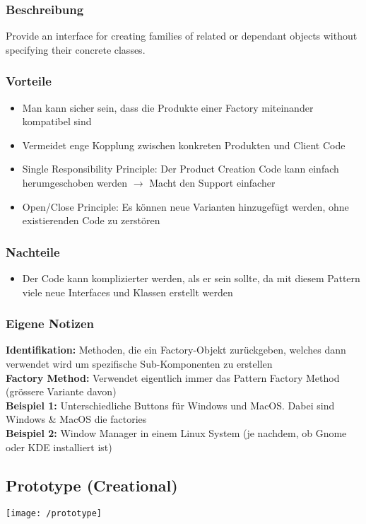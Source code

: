 \subsubsection{Beschreibung}
Provide an interface for creating families of related or dependant objects without specifying their concrete classes.
\subsubsection{Vorteile}
\begin{itemize}[topsep=0pt]
    \itemsep -0.4em
    \item Man kann sicher sein, dass die Produkte einer Factory miteinander kompatibel sind
    \item Vermeidet enge Kopplung zwischen konkreten Produkten und Client Code
    \item Single Responsibility Principle: Der Product Creation Code kann einfach herumgeschoben werden $\rightarrow$ Macht den Support einfacher
    \item Open/Close Principle: Es können neue Varianten hinzugefügt werden, ohne existierenden Code zu zerstören
\end{itemize}
\subsubsection{Nachteile}
\begin{itemize}[topsep=0pt]
    \itemsep -0.4em
    \item Der Code kann komplizierter werden, als er sein sollte, da mit diesem Pattern viele neue Interfaces und Klassen erstellt werden
\end{itemize}
\subsubsection{Eigene Notizen}
\textbf{Identifikation:} Methoden, die ein Factory-Objekt zurückgeben, welches dann verwendet wird um spezifische Sub-Komponenten zu erstellen\\
\textbf{Factory Method:} Verwendet eigentlich immer das Pattern Factory Method (grössere Variante davon)\\
\textbf{Beispiel 1:} Unterschiedliche Buttons für Windows und MacOS. Dabei sind Windows \& MacOS die factories\\
\textbf{Beispiel 2:} Window Manager in einem Linux System (je nachdem, ob Gnome oder KDE installiert ist)

\subsection{Prototype (Creational)}
\texttt{[image: /prototype]}
